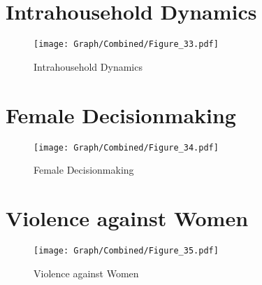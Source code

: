 \documentclass[10pt,a4paper]{article}
\begin{document}
\section{Intrahousehold Dynamics}
\begin{table}[H]\centering

\end{table}
\begin{figure}[H]\centering
\texttt{[image: Graph/Combined/Figure\_33.pdf]}
\caption{Intrahousehold Dynamics} \label{fig:Fig_33}
\end{figure}
\begin{table}[H]\centering

\end{table}
\pagebreak
\section{Female Decisionmaking}
\begin{table}[H]\centering

\end{table}
\begin{figure}[H]\centering
\texttt{[image: Graph/Combined/Figure\_34.pdf]}
\caption{Female Decisionmaking} \label{fig:Fig_34}
\end{figure}
\begin{table}[H]\centering

\end{table}
\pagebreak
\section{Violence against Women}
\begin{table}[H]\centering

\end{table}
\begin{figure}[H]\centering
\texttt{[image: Graph/Combined/Figure\_35.pdf]}
\caption{Violence against Women} \label{fig:Fig_35}
\end{figure}
\begin{table}[H]\centering

\end{table}
\pagebreak
\end{document}
